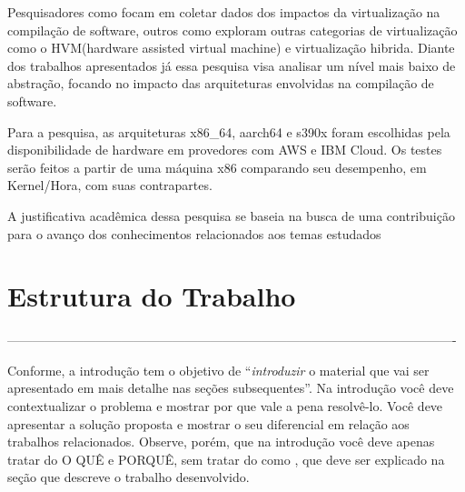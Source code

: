\documentclass[twoside,english,brazilian]{UNISINOSmonografia}
\begin{document}
Pesquisadores como  focam em coletar dados dos impactos da virtualização na compilação de software, outros como  exploram outras categorias de virtualização como o HVM(hardware assisted virtual machine) e virtualização hibrida. Diante dos trabalhos apresentados já essa pesquisa visa analisar um nível mais baixo de abstração, focando no impacto das arquiteturas envolvidas na compilação de software.

Para a pesquisa, as arquiteturas x86\_64, aarch64 e s390x foram escolhidas pela disponibilidade de hardware em provedores com AWS e IBM Cloud. Os testes serão feitos a partir de uma máquina x86 comparando seu desempenho, em Kernel/Hora, com suas contrapartes.

A justificativa acadêmica dessa pesquisa se baseia na busca de uma
contribuição para o avanço dos conhecimentos relacionados aos temas estudados

\section{Estrutura do Trabalho}

----------------------------------------------------------------------------------------------------------


Conforme, a introdução tem o objetivo de ``\emph{introduzir} o material que vai ser apresentado em mais detalhe nas seções subsequentes''. Na introdução você deve contextualizar o problema e mostrar por que vale a pena resolvê-lo. Você deve apresentar a solução proposta e mostrar o seu diferencial em relação aos trabalhos relacionados. Observe, porém, que na introdução você deve apenas tratar do O QUÊ e PORQUÊ, sem tratar do como \cite{Hexsel11}, que deve ser explicado na seção que descreve o trabalho desenvolvido.
\end{document}
